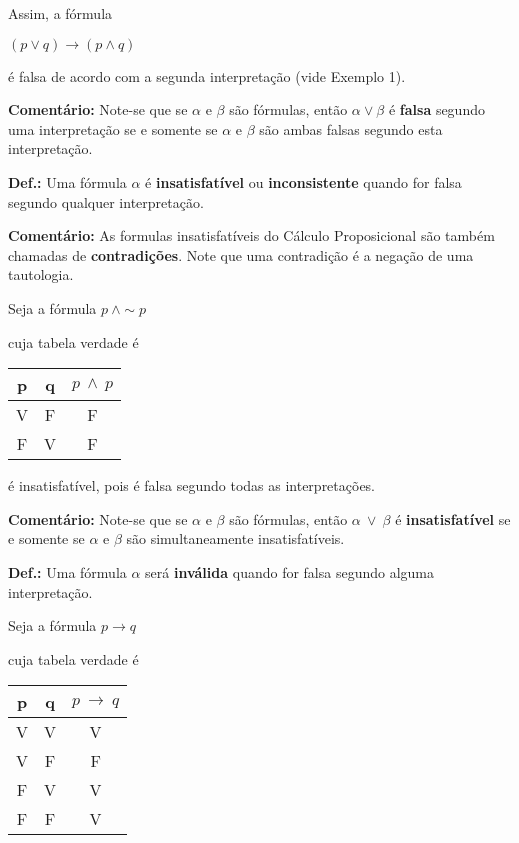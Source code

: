 \noindent Assim, a fórmula

\centerline{$(p \lor q) \to (p \land q)$}

\noindent é falsa de acordo com a segunda interpretação (vide Exemplo 1).

\bigskip
\noindent
\textbf{Comentário:} Note-se que se $\alpha$ e $\beta$ são fórmulas, então $\alpha \lor \beta$ é \textbf{falsa} segundo uma interpretação se e somente se $\alpha$ e $\beta$ são ambas falsas segundo esta interpretação.


\bigskip
\noindent
\textbf{Def.:} Uma fórmula $\alpha$ é \textbf{insatisfatível} ou \textbf{inconsistente}  quando for falsa segundo qualquer interpretação.

\bigskip
\noindent
\textbf{Comentário:} As formulas insatisfatíveis do  Cálculo Proposicional são também chamadas de \textbf{contradições}.
Note que uma contradição é a negação de uma tautologia.

\begin{exemplo}
    Seja a fórmula $p\ \land \sim p$
\end{exemplo}
\noindent cuja tabela verdade é

\begin{center}
    \begin{tabular}{c c c}
        p & q & $p\ \land ~p$ \\ \hline
        V & F & F \\
        F & V & F
    \end{tabular}
\end{center}
é insatisfatível, pois é falsa segundo todas as interpretações.

\bigskip
\noindent
\textbf{Comentário:} Note-se que se $\alpha$ e $\beta$ são fórmulas, então $\alpha\ \lor\ \beta$ é \textbf{insatisfatível} se e somente se $\alpha$ e $\beta$ são simultaneamente insatisfatíveis.

\bigskip
\noindent
\textbf{Def.:} Uma fórmula $\alpha$ será \textbf{inválida} quando for falsa segundo alguma interpretação.

\begin{exemplo}
    Seja a fórmula $p \to q$
\end{exemplo}
\noindent cuja tabela verdade é

\begin{center}
    \begin{tabular}{c c c}
        p & q & $p\ \to ~q$ \\ \hline
        V & V & V \\
        V & F & F \\
        F & V & V \\
        F & F & V
    \end{tabular}
\end{center}

